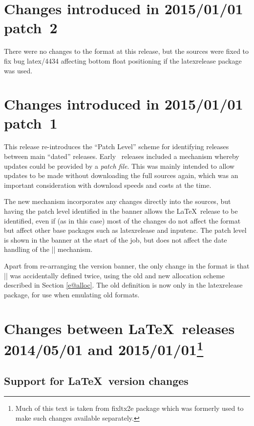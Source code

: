 \documentclass{ltxguide}
\newcommand\Lpack[1]{\mbox{\textsf{#1}}}
\newcommand\DescribeMacro[1]{\texttt{\string#1}}
\begin{document}
\section{Changes  introduced in 2015/01/01 patch~2}
There were no changes to the format at this release, but the sources were fixed to fix bug latex/4434
affecting bottom float positioning if the \Lpack{latexrelease} package was used.

\section{Changes  introduced in 2015/01/01 patch~1}
This release re-introduces the ``Patch Level'' scheme for identifying
releases between main ``dated'' releases. Early \LaTeXe\ releases
included a mechanism whereby updates could be provided by a
\emph{patch
  file}. This was mainly intended to allow updates to be made without
downloading the full sources again, which was an important
consideration with download speeds and costs at the time.

The new mechanism incorporates any changes directly into the sources,
but having the patch level identified in the banner allows the
\LaTeX\ release to be identified, even if (as in this case) most of the
changes do not affect the format but affect other base packages such
as \Lpack{latexrelease} and \Lpack{inputenc}. The patch level is shown
in the banner at the start of the job, but does not affect the date
handling of the |\IncludeInRelease| mechanism.

Apart from re-arranging the version banner, the only change in the
format is that |\newtoks| was accidentally defined twice, using the
old and new allocation scheme described in Section \ref{e@alloc}.
The old definition is now only in the \Lpack{latexrelease} package,
for use when emulating old formats.




\section
[Changes between  \LaTeX\ releases 2014/05/01 and 2015/01/01]
{Changes between \LaTeX\ releases 2014/05/01 and 2015/01/01\footnote{Much of this text
is taken from \Lpack{fixltx2e} package which was formerly used to make such changes available separately.}}

\subsection{Support for \LaTeX\ version changes}
\DescribeMacro{}
\end{document}
